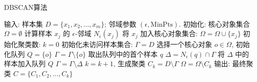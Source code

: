 \documentclass{article}
\begin{document}
\begin{algorithm}
\caption{DBSCAN算法}
\begin{algorithmic}[1]
\State 输入: 样本集 \( D = \{x_1, x_2, \ldots, x_m\} \); 邻域参数 \((\epsilon, \text{MinPts})\).
\State 初始化: 核心对象集合 \(\Omega = \emptyset\)
    \State 计算样本 \(x_j\) 的 \(\epsilon\)-邻域 \(N_{\epsilon}(x_j)\)
        \State 将 \(x_j\) 加入核心对象集合: \(\Omega = \Omega \cup \{x_j\}\)
    \EndIf
\EndFor
\State 初始化聚类数: \(k = 0\)
\State 初始化未访问样本集合: \(\Gamma = D\)
\While{\(\Omega \neq \emptyset\)}
    \State 选择一个核心对象 \(o \in \Omega\), 初始化队列 \(Q = \{o\}\)
    \State \(\Gamma = \Gamma \setminus \{o\}\)
        \State 取出队列中的首个样本 \(q\)
            \State \(\Delta = N_{\epsilon}(q) \cap \Gamma\)
            \State 将 \(\Delta\) 中的样本加入队列 \(Q\)
            \State \(\Gamma = \Gamma \setminus \Delta\)
        \EndIf
    \EndWhile
    \State \(k = k + 1\), 生成聚类 \(C_k = D \setminus \Gamma\)
    \State \(\Omega = \Omega \setminus C_k\)
\EndWhile
\State 输出: 最终聚类 \(C = \{C_1, C_2, \ldots, C_k\}\)
\end{algorithmic}
\end{algorithm}
\end{document}
